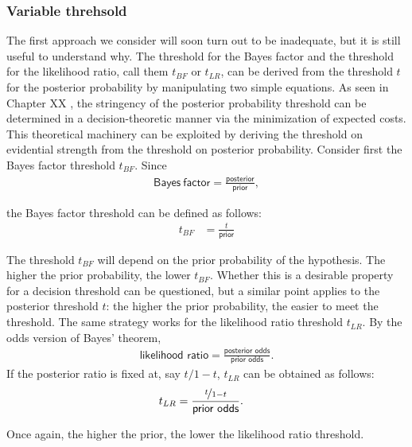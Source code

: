 \documentclass[
  10pt,
  dvipsnames,enabledeprecatedfontcommands]{scrartcl}
\begin{document}
\hypertarget{variable-threhsold}{%
\subsubsection{Variable threhsold}\label{variable-threhsold}}

The first approach we consider will soon turn out to be inadequate, but
it is still useful to understand why. The threshold for the Bayes factor
and the threshold for the likelihood ratio, call them \(t_{BF}\) or
\(t_{LR}\), can be derived from the threshold \(t\) for the posterior
probability by manipulating two simple equations. As seen in Chapter XX
, the stringency of the posterior
probability threshold can be determined in a decision-theoretic manner
via the minimization of expected costs. This theoretical machinery can
be exploited by deriving the threshold on evidential strength from the
threshold on posterior probability. Consider first the Bayes factor
threshold \(t_{BF}\). Since \begin{align*}
\mathsf{ Bayes \: factor }=\frac{\mathsf{posterior }}{\mathsf{ prior}},
\end{align*}

\noindent the Bayes factor threshold can be defined as follows:
\begin{align*}t_{BF} & = \frac{t}{\textsf{prior}}
\end{align*}

\noindent The threshold \(t_{BF}\) will depend on the prior probability
of the hypothesis. The higher the prior probability, the lower
\(t_{BF}\). Whether this is a desirable property for a decision
threshold can be questioned, but a similar point applies to the
posterior threshold \(t\): the higher the prior probability, the easier
to meet the threshold. The same strategy works for the likelihood ratio
threshold \(t_{LR}\). By the odds version of Bayes' theorem,
\begin{align*}\textsf{likelihood ratio}=\frac{\textsf{posterior odds}}{\textsf{prior odds}}.
\end{align*} If the posterior ratio is fixed at, say \(t/1-t\),
\(t_{LR}\) can be obtained as follows:
\begin{align*}t_{LR} & = \frac{\nicefrac{t}{1-t}}{\textsf{prior odds}}.
\end{align*}

\noindent Once again, the higher the prior, the lower the likelihood
ratio threshold.
\end{document}
